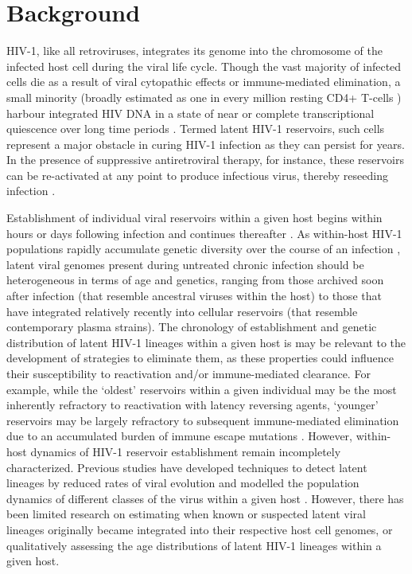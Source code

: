 \documentclass{bmcart}
\begin{document}
\baselineskip 30pt

\section * {Background} \label{sec:intro}

HIV-1, like all retroviruses, integrates its genome into the chromosome of the infected host cell during the viral life cycle.
Though the vast majority of infected cells die as a result of viral cytopathic effects or immune-mediated elimination, a small minority (broadly estimated as one in every million resting CD4+ T-cells \cite{Chun97,Finzi97}) harbour integrated HIV DNA in a state of near or complete transcriptional quiescence over long time periods \cite{Archin14,Pace11,Richman09}.
Termed latent HIV-1 reservoirs, such cells represent a major obstacle in curing HIV-1 infection as they can persist for years.
In the presence of suppressive antiretroviral therapy, for instance, these reservoirs can be re-activated at any point to produce infectious virus, thereby reseeding infection \cite{Richman09,Durand12,Joos08,Katlama13,Pomerantz03,Shen08}. 

Establishment of individual viral reservoirs within a given host  begins within hours or days following infection and continues thereafter \cite{Whitney14,Leford14}.
As within-host HIV-1 populations rapidly accumulate genetic diversity over the course of an infection \cite{Alizon13,Rambaut04,Shankarappa99}, latent viral genomes present during untreated chronic infection should be heterogeneous in terms of age and genetics, ranging from those archived soon after infection (that resemble ancestral viruses within the host) to those that have integrated relatively recently into cellular reservoirs (that resemble contemporary plasma strains).
The chronology of establishment and genetic distribution of latent HIV-1 lineages within a given host is may be relevant to the development of strategies to eliminate them, as these properties could influence their susceptibility to reactivation and/or immune-mediated clearance.
For example, while the `oldest' reservoirs within a given individual may be the most inherently refractory to reactivation with latency reversing agents, `younger' reservoirs may be largely refractory to subsequent immune-mediated elimination due to an accumulated burden of immune escape mutations \cite{Deng15}.
However, within-host dynamics of HIV-1 reservoir establishment remain incompletely characterized.
Previous studies have developed techniques to detect latent lineages by reduced rates of viral evolution \cite{Immonen14} and modelled the population dynamics of different classes of the virus within a given host \cite{Althaus14}.
However, there has been limited research on estimating when known or suspected latent viral lineages originally became integrated into their respective host cell genomes, or qualitatively assessing the age distributions of latent HIV-1 lineages within a given host.  
\end{document}
